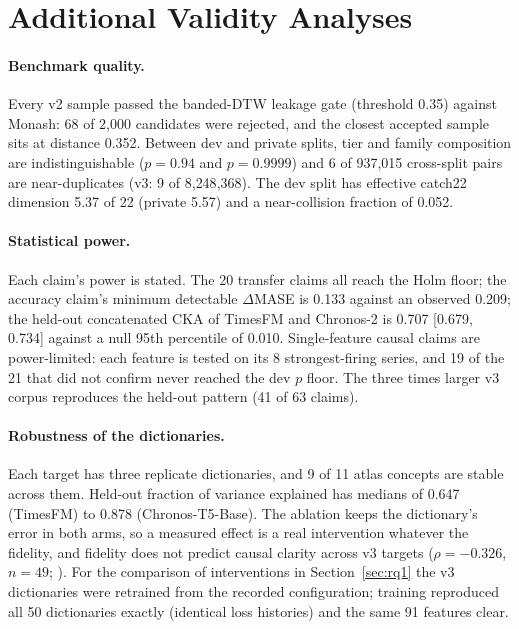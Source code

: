 \section{Additional Validity Analyses}
\label{app:faq}

\paragraph{Benchmark quality.} Every v2 sample passed the banded-DTW leakage gate (threshold 0.35) against Monash: 68 of
2{,}000 candidates were rejected, and the closest accepted sample sits at distance 0.352. Between dev and private splits,
tier and family composition are indistinguishable ($p=0.94$ and $p=0.9999$) and 6 of 937{,}015 cross-split pairs are
near-duplicates (v3: 9 of 8{,}248{,}368). The dev split has effective catch22 dimension 5.37 of 22 (private 5.57) and a
near-collision fraction of 0.052.

\paragraph{Statistical power.} Each claim's power is stated. The 20 transfer claims all reach the Holm floor; the
accuracy claim's minimum detectable $\Delta$MASE is 0.133 against an observed 0.209; the held-out concatenated CKA of
TimesFM and Chronos-2 is 0.707 [0.679, 0.734] against a null 95th percentile of 0.010. Single-feature causal claims are
power-limited: each feature is tested on its 8 strongest-firing series, and 19 of the 21 that did not confirm never
reached the dev $p$ floor. The three times larger v3 corpus reproduces the held-out pattern (41 of 63 claims).

\paragraph{Robustness of the dictionaries.} Each target has three replicate dictionaries, and 9 of 11 atlas concepts are
stable across them. Held-out fraction of variance explained has medians of 0.647 (TimesFM) to 0.878 (Chronos-T5-Base). The
ablation keeps the dictionary's error in both arms, so a measured effect is a real intervention whatever the fidelity, and
fidelity does not predict causal clarity across v3 targets ($\rho=-0.326$, $n=49$; ). For the comparison of
interventions in Section~\ref{sec:rq1} the v3 dictionaries were retrained from the recorded configuration; training
reproduced all 50 dictionaries exactly (identical loss histories) and the same 91 features clear.

